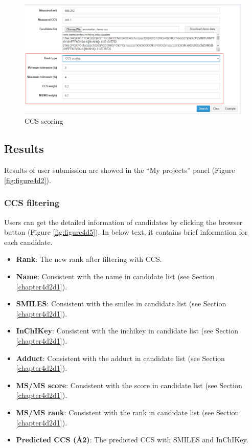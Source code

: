 \documentclass[12pt,]{book}
\providecommand{\tightlist}{%
  \setlength{\itemsep}{0pt}\setlength{\parskip}{0pt}}
\begin{document}
\begin{figure}

{\centering \includegraphics{images/chapter4/figure4.4CCS_scoring} 

}

\caption{CCS scoring}\label{fig:figure4d4}
\end{figure}

\subsection{Results}\label{chapter4d2d3}

Results of user submission are showed in the ``My projects'' panel
(Figure \ref{fig:figure4d2}).

\subsubsection{CCS filtering}\label{chapter4d2d3d1}

Users can get the detailed information of candidates by clicking the
browser button (Figure \ref{fig:figure4d5}). In below text, it contains
brief information for each candidate.

\begin{itemize}
\tightlist
\item
  \textbf{Rank}: The new rank after filtering with CCS.
\item
  \textbf{Name}: Consistent with the name in candidate list (see Section
  \ref{chapter4d2d1}).
\item
  \textbf{SMILES}: Consistent with the smiles in candidate list (see
  Section \ref{chapter4d2d1}).
\item
  \textbf{InChIKey}: Consistent with the inchikey in candidate list (see
  Section \ref{chapter4d2d1}).
\item
  \textbf{Adduct}: Consistent with the adduct in candidate list (see
  Section \ref{chapter4d2d1}).
\item
  \textbf{MS/MS score}: Consistent with the score in candidate list (see
  Section \ref{chapter4d2d1}).
\item
  \textbf{MS/MS rank}: Consistent with the rank in candidate list (see
  Section \ref{chapter4d2d1}).
\item
  \textbf{Predicted CCS (Å2)}: The predicted CCS with SMILES and
  InChIKey.
\end{itemize}
\end{document}
